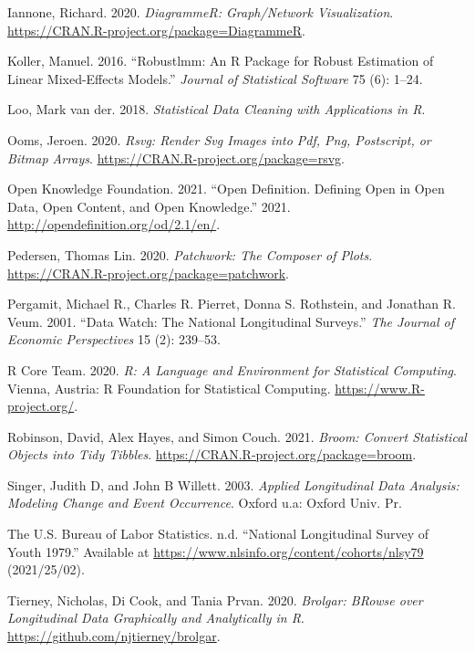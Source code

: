 \documentclass{article}
\begin{document}
\leavevmode\hypertarget{ref-DiagrammeR}{}%
Iannone, Richard. 2020. \emph{DiagrammeR: Graph/Network Visualization}. \url{https://CRAN.R-project.org/package=DiagrammeR}.

\leavevmode\hypertarget{ref-KollerManuel2016rARP}{}%
Koller, Manuel. 2016. ``Robustlmm: An R Package for Robust Estimation of Linear Mixed-Effects Models.'' \emph{Journal of Statistical Software} 75 (6): 1--24.

\leavevmode\hypertarget{ref-LooMarkvander2018Sdcw}{}%
Loo, Mark van der. 2018. \emph{Statistical Data Cleaning with Applications in R}.

\leavevmode\hypertarget{ref-rsvg}{}%
Ooms, Jeroen. 2020. \emph{Rsvg: Render Svg Images into Pdf, Png, Postscript, or Bitmap Arrays}. \url{https://CRAN.R-project.org/package=rsvg}.

\leavevmode\hypertarget{ref-opendata}{}%
Open Knowledge Foundation. 2021. ``Open Definition. Defining Open in Open Data, Open Content, and Open Knowledge.'' 2021. \url{http://opendefinition.org/od/2.1/en/}.

\leavevmode\hypertarget{ref-patchwork}{}%
Pedersen, Thomas Lin. 2020. \emph{Patchwork: The Composer of Plots}. \url{https://CRAN.R-project.org/package=patchwork}.

\leavevmode\hypertarget{ref-MichaelRPergamit2001DWTN}{}%
Pergamit, Michael R., Charles R. Pierret, Donna S. Rothstein, and Jonathan R. Veum. 2001. ``Data Watch: The National Longitudinal Surveys.'' \emph{The Journal of Economic Perspectives} 15 (2): 239--53.

\leavevmode\hypertarget{ref-R}{}%
R Core Team. 2020. \emph{R: A Language and Environment for Statistical Computing}. Vienna, Austria: R Foundation for Statistical Computing. \url{https://www.R-project.org/}.

\leavevmode\hypertarget{ref-broom}{}%
Robinson, David, Alex Hayes, and Simon Couch. 2021. \emph{Broom: Convert Statistical Objects into Tidy Tibbles}. \url{https://CRAN.R-project.org/package=broom}.

\leavevmode\hypertarget{ref-SingerJudithD2003Alda}{}%
Singer, Judith D, and John B Willett. 2003. \emph{Applied Longitudinal Data Analysis: Modeling Change and Event Occurrence}. Oxford u.a: Oxford Univ. Pr.

\leavevmode\hypertarget{ref-nlsy79}{}%
The U.S. Bureau of Labor Statistics. n.d. ``National Longitudinal Survey of Youth 1979.'' Available at \url{https://www.nlsinfo.org/content/cohorts/nlsy79} (2021/25/02).

\leavevmode\hypertarget{ref-brolgar}{}%
Tierney, Nicholas, Di Cook, and Tania Prvan. 2020. \emph{Brolgar: BRowse over Longitudinal Data Graphically and Analytically in R}. \url{https://github.com/njtierney/brolgar}.
\end{document}
